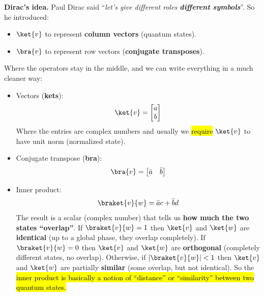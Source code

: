 \highspace
\textcolor{Green3}{ \textbf{Dirac's idea.}} Paul Dirac said ``\emph{let's give different roles \textbf{different symbols}}''. So he introduced:
\begin{itemize}
    \item {} $\ket{v}$ to represent \textbf{column vectors} (quantum states).
    \item  {} $\bra{v}$ to represent row vectors (\textbf{conjugate transposes}).
\end{itemize}
Where the operators stay in the middle, and we can write everything in a much cleaner way:
\begin{itemize}
    \item Vectors (\textbf{kets}):
    \begin{equation}
        \ket{v} = \begin{bmatrix}
            a \\ b
        \end{bmatrix}
    \end{equation}
    Where the entries are complex numbers and usually we \hl{require} $\ket{v}$ to have unit norm (normalized state).
    
    \item Conjugate transpose (\textbf{bra}):
    \begin{equation}
        \bra{v} = \begin{bmatrix}
            \bar{a} & \bar{b}
        \end{bmatrix}
    \end{equation}
    
    \item Inner product:
    \begin{equation}\label{eq:inner-product}
        \braket{v}{w} = \bar{a}c + \bar{b}d
    \end{equation}
    The result is a scalar (complex number) that tells us \textbf{how much the two states ``overlap''}. If $\braket{v}{w} = 1$ then $\ket{v}$ and $\ket{w}$ are \textbf{identical} (up to a global phase, they overlap completely). If $\braket{v}{w} = 0$ then $\ket{v}$ and $\ket{w}$ are \textbf{orthogonal} (completely different states, no overlap). Otherwise, if $\left|\braket{v}{w}\right| < 1$ then $\ket{v}$ and $\ket{w}$ are partially \textbf{similar} (some overlap, but not identical). So the \hl{inner product is basically a notion of ``distance'' or ``similarity'' between two quantum states.}
    

\end{itemize}
